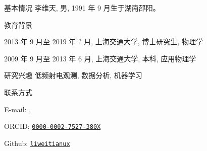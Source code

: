 
\begin{resume}
  \begin{resumesection}{基本情况}
    李维天, 男, 1991 年 9 月生于湖南邵阳。
  \end{resumesection}

  \begin{resumelist}{教育背景}
    \item 2013 年 9 月至 2019 年 ? 月, 上海交通大学, 博士研究生, 物理学
    \item 2009 年 9 月至 2013 年 6 月, 上海交通大学, 本科, 应用物理学
  \end{resumelist}

  \begin{resumesection}{研究兴趣}
    低频射电观测, 数据分析, 机器学习
  \end{resumesection}

  \begin{resumelist}{联系方式}
    \item E-mail:
      , \hspace{0.5em}
    \item ORCID:
      \href{https://orcid.org/0000-0002-7527-380X}{\texttt{0000-0002-7527-380X}}
    \item Github:
      \href{https://github.com/liweitianux}{\texttt{liweitianux}}
  \end{resumelist}
\end{resume}
